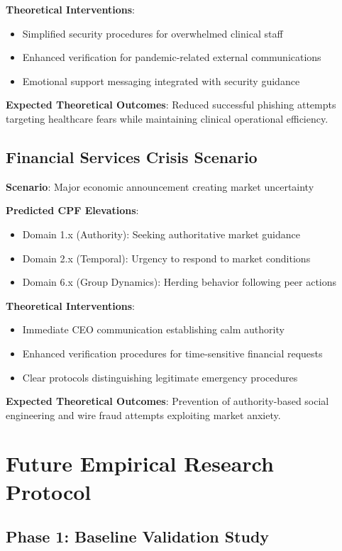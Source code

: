 \documentclass[11pt,a4paper]{article}
\begin{document}
\textbf{Theoretical Interventions}:
\begin{itemize}
\item Simplified security procedures for overwhelmed clinical staff
\item Enhanced verification for pandemic-related external communications
\item Emotional support messaging integrated with security guidance
\end{itemize}

\textbf{Expected Theoretical Outcomes}: Reduced successful phishing attempts targeting healthcare fears while maintaining clinical operational efficiency.

\subsection{Financial Services Crisis Scenario}

\textbf{Scenario}: Major economic announcement creating market uncertainty

\textbf{Predicted CPF Elevations}:
\begin{itemize}
\item Domain 1.x (Authority): Seeking authoritative market guidance
\item Domain 2.x (Temporal): Urgency to respond to market conditions
\item Domain 6.x (Group Dynamics): Herding behavior following peer actions
\end{itemize}

\textbf{Theoretical Interventions}:
\begin{itemize}
\item Immediate CEO communication establishing calm authority
\item Enhanced verification procedures for time-sensitive financial requests
\item Clear protocols distinguishing legitimate emergency procedures
\end{itemize}

\textbf{Expected Theoretical Outcomes}: Prevention of authority-based social engineering and wire fraud attempts exploiting market anxiety.

\section{Future Empirical Research Protocol}

\subsection{Phase 1: Baseline Validation Study}
\end{document}
